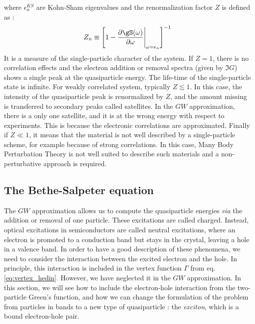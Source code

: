 where $\epsilon^{KS}_n$ are Kohn-Sham eigenvalues and the renormalization factor $Z$ is defined as :
\begin{equation}
	Z_n \equiv \left[ 1 - \frac{\partial \gS(\omega)}{\partial \omega} \Biggr|_{\omega = \epsilon_n} \right]^{-1}
\end{equation}
It is a measure of the single-particle character of the system. If $Z=1$, there is no correlation effects and the electron addition or removal spectra (given by $\Im G$) shows a single peak at the quasiparticle energy. The life-time of the single-particle state is infinite. For weakly correlated system, typically $Z \lesssim 1$. In this case, the intensity of the quasiparticle peak is renormalized by $Z$, and the amount missing is transferred to secondary peaks called satellites. In the $GW$ approximation, there is a only one satellite, and it is at the wrong energy with respect to experiments.\cite{PhysRevLett.107.166401} This is because the electronic correlations are approximated. Finally if $Z \ll 1$, it means that the material is not well described by a single-particle scheme, for example because of strong correlations. In this case, Many Body Perturbation Theory is not well suited to describe such materials and a non-perturbative approach is required.


\subsection{The Bethe-Salpeter equation}

The $GW$ approximation allows us to compute the quasiparticle energies \textit{via} the addition or removal of one particle. These excitations are called charged. Instead, optical excitations in semiconductors are called neutral excitations, where an electron is promoted to a conduction band but stays in the crystal, leaving a hole in a valence band. In order to have a good description of these phenomena, we need to consider the interaction between the excited electron and the hole. In principle, this interaction is included in the vertex function $\Gamma$ from eq. \eqref{eq:vertex_hedin}. However, we have neglected it in the $GW$ approximation. In this section, we will see how to include the electron-hole interaction from the two-particle Green's function, and how we can change the formulation of the problem from particles in bands to a new type of quasiparticle : the \textit{exciton}, which is a bound electron-hole pair.

